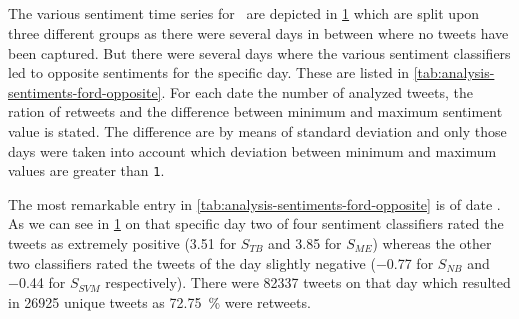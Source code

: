 \subsection{\ford}
\label{ss:analysis-sentiments-ford}

The various sentiment time series for \ford\ are depicted in \cref{fig:analysis-sentiments-ford} which are split upon three different groups as there were several days in between where no tweets have been captured.
But there were several days where the various sentiment classifiers led to opposite sentiments for the specific day.
These are listed in \cref{tab:analysis-sentiments-ford-opposite}.
For each date the number of analyzed tweets, the ration of retweets and the difference between minimum and maximum sentiment value is stated.
The difference are by means of standard deviation and only those days were taken into account which deviation between minimum and maximum values are greater than \texttt{1}.

\begin{figure}[hbt]
    \centering
    
    \caption{\sentimentsCaption{\ford}}
    \label{fig:analysis-sentiments-ford}
\end{figure} 


The most remarkable entry in \cref{tab:analysis-sentiments-ford-opposite} is of date .
As we can see in \cref{fig:analysis-sentiments-ford} on that specific day two of four sentiment classifiers rated the tweets as extremely positive (\num{3.51} for $S_{TB}$ and \num{3.85} for $S_{ME}$) whereas the other two classifiers rated the tweets of the day slightly negative (\num{-0.77} for $S_{NB}$ and \num{-0.44} for $S_{SVM}$ respectively).
There were \num{82337} tweets on that day which resulted in \num{26925} unique tweets as \SI{72.75}{\percent} were retweets.

